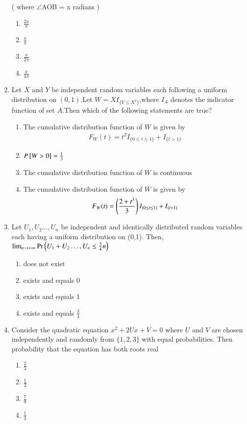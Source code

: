 \begin{enumerate}[label=\thesection.\arabic*.,ref=\thesection.\theenumi]
( where $\angle$AOB = x radians )


    \begin{enumerate}
        \item $\frac{2x}{\pi}$
        \item $\frac{x}{\pi}$
        \item $\frac{x}{2\pi}$
        \item $\frac{x}{4\pi}$
    \end{enumerate}

%
\solution

%
\item Let $X$ and $Y$ be independent random variables each following a uniform distribution on $(0,1)$.Let $W=XI_{\{Y\leq X^2\}}$,where $I_A$ denotes the indicator function of set $A$.Then which of the following statements are true? \\
\begin{enumerate}
\item The cumulative distribution function of $W$ is given by
\begin{align}
  F_W(t)=t^2I_{\{0\leq t \leq 1\}}+ I_{\{t > 1\}}
\end{align}
\item $P{}\left[W>0\right]=\frac{1}{3}$
\item The cumulative distribution function of $W$ is continuous
\item The cumulative distribution function of $W$ is given by
\begin{align}
  F_W(t)=\left(\frac{2+t^3}{3}\right)I_{\{0\leq t \leq 1\}}+ I_{\{t > 1\}}
\end{align}
\end{enumerate}
%
\solution

%
\item Let $U_1,U_2\dots,U_n$ be independent and identically distributed random variables each
having a uniform distribution on (0,1). Then,$\lim_{n \to +\infty} \Pr\left(U_1+U_2\dots,U_n\leq \frac{3}{4}n\right)$
\begin{enumerate}
    \item does not exist
    \item exists and equals 0
    \item exists and equals 1
    \item exists and equals $\frac{3}{4}$
\end{enumerate}
%
\solution

%
\item  Consider the quadratic equation $x^2+2U x+V=0$ where $U$ and $V$ are chosen independently and randomly from $\{1,2,3\}$ with equal probabilities. Then probability that the equation has both roots real
\begin{enumerate}
    \item $\frac{2}{3}$
    \item $\frac{1}{2}$
    \item $\frac{7}{9}$
    \item $\frac{1}{3}$
\end{enumerate}
%
\solution

%

\end{enumerate}

